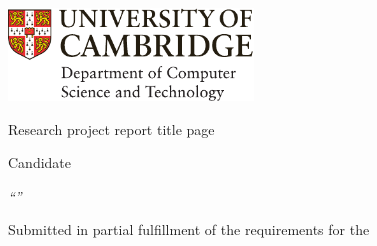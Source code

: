 \begin{sffamily} %

    \begin{titlepage}
        \makeatletter

        \hspace*{-14mm}\includegraphics[width=65mm]{logo-dcst-colour.pdf}

        \ifsubmission

            \begin{Large}
                \vspace{20mm}
                Research project report title page

                \vspace{35mm}
                Candidate \candidatenumber

                \vspace{42mm}
                \textsl{``\@title''}

            \end{Large}

        \else

            \begin{center}
                \Huge
                \vspace{\fill}

                \@title
                \vspace{\fill}

                \@author
                \vspace{10mm}

                \Large
                \college
                \vspace{\fill}

                \@date
                \vspace{\fill}

            \end{center}

        \fi

        \vspace{\fill}
        \begin{center}
            Submitted in partial fulfillment of the requirements for the\\
            \course
        \end{center}


\end{titlepage}
\end{sffamily}

